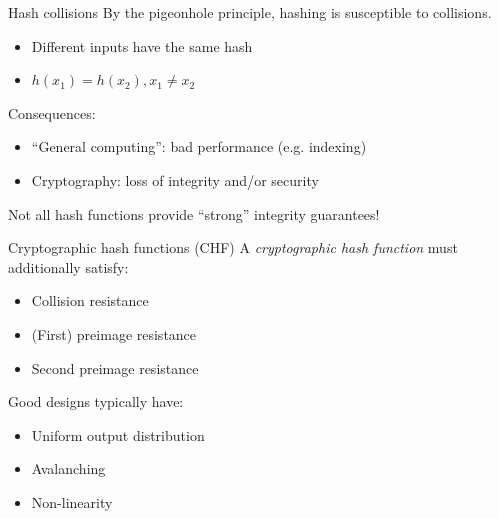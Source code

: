 \begin{frame}{Hash collisions}
  By the pigeonhole principle, hashing is susceptible to collisions.
  \begin{itemize}[<+(1)->]
    \item Different inputs have the same hash
    \item $h(x_1) = h(x_2), x_1 \neq x_2$
  \end{itemize}

  \vspace*{1em}

  \pause
  Consequences:
  \begin{itemize}[<+(1)->]
    \item \enquote{General computing}: bad performance (e.g. indexing)
    \item Cryptography: loss of integrity and/or security
  \end{itemize}

  \vspace*{1em}

  \pause
  Not all hash functions provide \enquote{strong} integrity guarantees!
\end{frame}

\begin{frame}{Cryptographic hash functions (CHF)}
  A \emph{cryptographic hash function} must additionally satisfy:
  \begin{itemize}[<+(1)->]
    \item Collision resistance
    \item (First) preimage resistance
    \item Second preimage resistance
  \end{itemize}

  \vspace*{1em}

  \pause
  Good designs typically have:
  \begin{itemize}[<+(1)->]
    \item Uniform output distribution
    \item Avalanching
    \item Non-linearity
  \end{itemize}
\end{frame}

